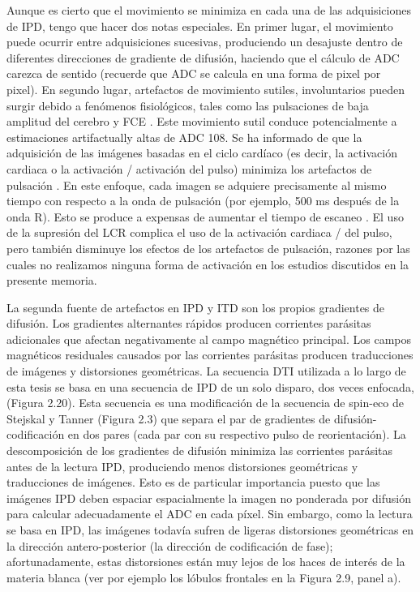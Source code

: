 Aunque es cierto que el movimiento se minimiza en cada una de las adquisiciones de IPD, tengo que hacer dos notas especiales. En primer lugar, el movimiento puede ocurrir entre adquisiciones sucesivas, produciendo un desajuste dentro de diferentes direcciones de gradiente de difusión, haciendo que el cálculo de ADC carezca de sentido (recuerde que ADC se calcula en una forma de pixel por pixel). En segundo lugar, artefactos de movimiento sutiles, involuntarios pueden surgir debido a fenómenos fisiológicos, tales como las pulsaciones de baja amplitud del cerebro y FCE \cite{107}. Este movimiento sutil conduce potencialmente a estimaciones artifactually altas de ADC 108. Se ha informado de que la adquisición de las imágenes basadas en el ciclo cardíaco (es decir, la activación cardiaca o la activación / activación del pulso) minimiza los artefactos de pulsación \cite{108,109}. En este enfoque, cada imagen se adquiere precisamente al mismo tiempo con respecto a la onda de pulsación (por ejemplo, 500 ms después de la onda R). Esto se produce a expensas de aumentar el tiempo de escaneo \cite{108}. El uso de la supresión del LCR \cite{Concha_2005} complica el uso de la activación cardiaca / del pulso, pero también disminuye los efectos de los artefactos de pulsación, razones por las cuales no realizamos ninguna forma de activación en los estudios discutidos en la presente memoria.

La segunda fuente de artefactos en IPD y ITD son los propios gradientes de difusión. Los gradientes alternantes rápidos producen corrientes parásitas adicionales que afectan negativamente al campo magnético principal. Los campos magnéticos residuales causados por las corrientes parásitas producen traducciones de imágenes y distorsiones geométricas. La secuencia DTI utilizada a lo largo de esta tesis se basa en una secuencia de IPD de un solo disparo, dos veces enfocada, \cite{110} (Figura 2.20). Esta secuencia es una modificación de la secuencia de spin-eco de Stejskal y Tanner (Figura 2.3) que separa el par de gradientes de difusión-codificación en dos pares (cada par con su respectivo pulso de reorientación). La descomposición de los gradientes de difusión minimiza las corrientes parásitas antes de la lectura IPD, produciendo menos distorsiones geométricas y traducciones de imágenes. Esto es de particular importancia puesto que las imágenes IPD deben espaciar espacialmente la imagen no ponderada por difusión para calcular adecuadamente el ADC en cada píxel. Sin embargo, como la lectura se basa en IPD, las imágenes todavía sufren de ligeras distorsiones geométricas en la dirección antero-posterior (la dirección de codificación de fase); afortunadamente, estas distorsiones están muy lejos de los haces de interés de la materia blanca (ver por ejemplo los lóbulos frontales en la Figura 2.9, panel a).


